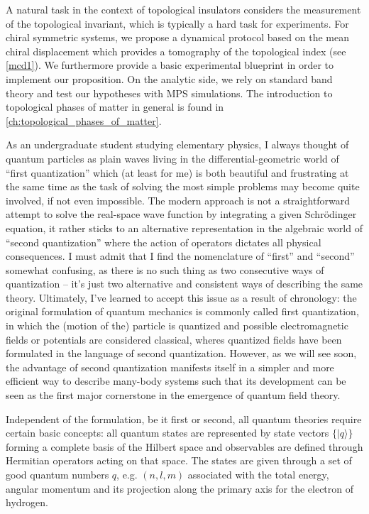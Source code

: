 A natural task in the context of topological insulators considers the measurement of the topological invariant, which is typically a hard task for experiments.
For chiral symmetric systems, we propose a dynamical protocol based on the mean chiral displacement which provides a tomography of the topological index (see \cref{mcd1}).
We furthermore provide a basic experimental blueprint in order to implement our proposition.
On the analytic side, we rely on standard band theory and test our hypotheses with MPS simulations.
The introduction to topological phases of matter in general is found in \cref{ch:topological_phases_of_matter}.

As an undergraduate student studying elementary physics, I always thought of quantum particles as plain waves living in the differential-geometric world of ``first quan\-ti\-zation'' which (at least for me) is both beautiful and frustrating at the same time as the task of solving the most simple problems may become quite involved, if not even impossible.
The modern approach is not a straightforward attempt to solve the real-space wave function by integrating a given Schrödinger equation, it rather sticks to an alternative representation in the algebraic world of ``second quantization'' where the action of operators dictates all physical consequences.
I must admit that I find the nomenclature of ``first'' and ``second'' somewhat confusing, as there is no such thing as two consecutive ways of quantization -- it's just two alternative and consistent ways of describing the same theory.
Ultimately, I've learned to accept this issue as a result of chronology: the original formulation of quantum mechanics is commonly called first quantization, in which the (motion of the) particle is quantized and possible electromagnetic fields or potentials are considered classical, wheres quantized fields have been formulated in the language of second quantization.
However, as we will see soon, the advantage of second quantization manifests itself in a simpler and more efficient way to describe many-body systems such that its development can be seen as the first major cornerstone in the emergence of quantum field theory.

Independent of the formulation, be it first or second, all quantum theories require certain basic concepts:
all quantum states are represented by state vectors $\{|q\rangle\}$ forming a complete basis of the Hilbert space and observables are defined through Hermitian operators acting on that space.
The states are given through a set of good quantum numbers $q$, e.g. $(n,l,m)$ associated with the total energy, angular momentum and its projection along the primary axis for the electron of hydrogen.


